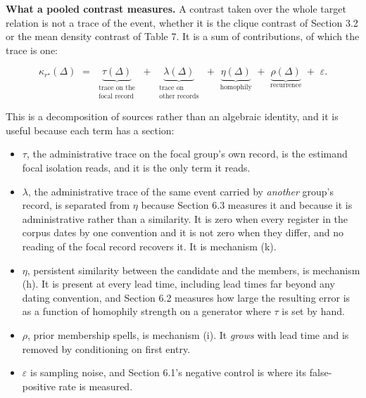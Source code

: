 \documentclass[twoside,11pt]{article}
\providecommand{\tightlist}{%
  \setlength{\itemsep}{0pt}\setlength{\parskip}{0pt}}
\begin{document}
\textbf{What a pooled contrast measures.} A contrast taken over the whole target relation is not a trace of the event, whether it is the clique contrast of Section 3.2 or the mean density contrast of Table 7. It is a sum of contributions, of which the trace is one:

\[\kappa_{r^{\star}}(\Delta)\mspace{6mu} = \mspace{6mu}\underset{\begin{matrix}
\text{trace on the} \\
\text{focal record}
\end{matrix}}{\underbrace{\tau(\Delta)}}\mspace{6mu} + \mspace{6mu}\underset{\begin{matrix}
\text{trace on} \\
\text{other records}
\end{matrix}}{\underbrace{\lambda(\Delta)}}\mspace{6mu} + \mspace{6mu}\underset{\text{homophily}}{\underbrace{\eta(\Delta)}}\mspace{6mu} + \mspace{6mu}\underset{\text{recurrence}}{\underbrace{\rho(\Delta)}}\mspace{6mu} + \mspace{6mu}\varepsilon.\]

This is a decomposition of sources rather than an algebraic identity, and it is useful because each term has a section:

\begin{itemize}
\tightlist
\item
  \(\tau\), the administrative trace on the focal group's own record, is the estimand focal isolation reads, and it is the only term it reads.
\item
  \(\lambda\), the administrative trace of the same event carried by \emph{another} group's record, is separated from \(\eta\) because Section 6.3 measures it and because it is administrative rather than a similarity. It is zero when every register in the corpus dates by one convention and it is not zero when they differ, and no reading of the focal record recovers it. It is mechanism (k).
\item
  \(\eta\), persistent similarity between the candidate and the members, is mechanism (h). It is present at every lead time, including lead times far beyond any dating convention, and Section 6.2 measures how large the resulting error is as a function of homophily strength on a generator where \(\tau\) is set by hand.
\item
  \(\rho\), prior membership spells, is mechanism (i). It \emph{grows} with lead time and is removed by conditioning on first entry.
\item
  \(\varepsilon\) is sampling noise, and Section 6.1's negative control is where its false-positive rate is measured.
\end{itemize}
\end{document}
